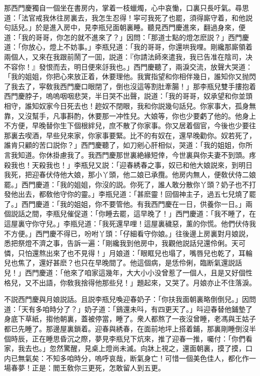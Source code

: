 那西門慶獨自一個坐在書房内，掌着一枝蠟燭，心中哀慟，口裏只長吁氣。尋思道：「法官戒我休往房裏去，我怎生忍得！寜可我死了也罷，須得廝守着，和他説句話兒。」於是進入房中，見李瓶兒面朝裏睡。聽見西門慶進來，翻過身來，便道：「我的哥哥，你怎的就不進來了？」因問：「那道士點的燈怎麽説？」西門慶道：「你放心，燈上不妨事。」李瓶兒道：「我的哥哥，你還哄我哩。剛纔那廝領着兩個人，又來在我跟前鬧了一囬，説道：『你請法師來遣我，我已告准在陰司，决不容你！』發恨而去，明日便來㧱我也。」西門慶聽了，兩淚交流，放聲大哭道：「我的姐姐，你把心來放正着，休要理他。我實指望和你相伴幾日，誰知你又抛閃了我去了，寜敎我西門慶口眼閉了，倒也沒這等割肚牽腸！」那李瓶兒雙手摟抱着西門慶脖子，嗚嗚咽咽悲哭，半日哭不出聲，説道：「我的哥哥，奴承望和你並頭相守，誰知奴家今日死去也！趂奴不閉眼，我和你説幾句話兒。你家事大，孤身無靠，又沒幫手，凡事斟酌，休要那一冲性兒。大娘等，你也少要虧了他的。他身上不方便，早晚替你生下個根絆兒，庶不散了你家事。你又居着個官，今後也少要往那裏去喫酒，早些兒來家，你家事要緊。比不的有奴在，還早晚勸你。奴若死了，誰肯只顧的苦口説你？」西門慶聽了，如刀剜心肝相似，哭道：「我的姐姐，你所言我知道。你休掛慮我了。我西門慶那世裏絶緣短倖，今世裏與你夫妻不到頭。疼殺我也！天殺我也！」李瓶兒又説：「迎春綉春之事，奴已和他大娘説來，到明日我死，把迎春伏侍他大娘，那小丫頭，他二娘已承攬。他房内無人，便敎伏侍二娘罷。」西門慶道：「我的姐姐，你沒的説。你死了，誰人敢分散你丫頭？奶子也不打發他出去，都敎他守你的靈。」李瓶兒道：「甚麽靈！回個神主子，過五七兒燒了罷了。」西門慶道：「我的姐姐，你不要管他。有我西門慶在一日，供養你一日。」兩個説話之間，李瓶兒催促道：「你睡去罷，這早晚了！」西門慶道：「我不睡了，在這屋裏守你守兒。」李瓶兒道：「我死還早哩！這屋裏穢惡，薰的你慌。他們伏侍我不方便。」西門慶不得已，吩咐丫頭：「仔細看守你娘。」往後邊上房裏對月娘説，悉把祭燈不濟之事，告訴一遍：「剛纔我到他房中，我觀他説話兒還伶俐。天可憐，只怕還熬出來了也不見得！」月娘道：「眼眶兒也塌了，嘴唇兒也乾了，耳輪兒也焦了，還好甚麽？也只在早晚間了。他這個病，是恁伶俐，臨断氣還説話兒！」西門慶道：「他來了咱家這幾年，大大小小没曾惹了一個人，且是又好個性格兒，又不出語，你敎我捨得他那些兒！」題起來，又哭了。月娘亦止不住落淚。

不説西門慶與月娘説話。且説李瓶兒喚迎春奶子：「你扶我面朝裏略倒倒兒。」因問道：「天有多咱時分了？」奶子道：「鷄還未呌，有四更天了。」呌迎春替他鋪墊了身底下草紙，搊他朝裏，蓋被停當，睡了。衆人都熬了一夜沒曾睡，老馮與王姑子都已先睡了。那邊屋裏鎖着。迎春與綉春，在面前地坪上搭着鋪，那裏剛睡倒沒半個時辰，正在睡思昏沉之際，夢見李瓶兒下炕來，推了迎春一推，囑付：「你們看家，我去也。」忽然驚醒，見桌上燈尚未滅。向牀上視之，還面朝裏，摸了摸，口内已無氣矣：不知多咱時分，嗚呼哀哉，断氣身亡！可惜一個美色佳人，都化作一場春夢！正是：閻王敎你三更死，怎敢留人到五更。

